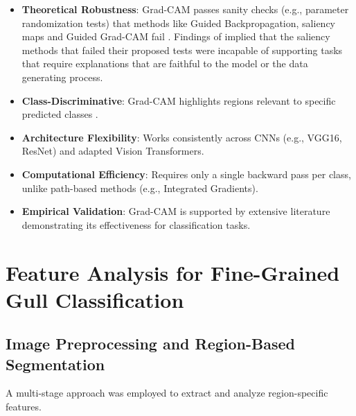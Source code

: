 \documentclass[a4paper,12pt]{report}
\begin{document}
\begin{itemize}
\item \textbf{Theoretical Robustness}: Grad-CAM passes sanity checks (e.g., parameter randomization tests) that methods like Guided Backpropagation, saliency maps and Guided Grad-CAM fail \citep{Adebayo2018}. Findings of \citep{Adebayo2018} implied that the saliency methods that failed their proposed tests were incapable of supporting tasks that require explanations that are faithful to the model or the data generating process.
\item \textbf{Class-Discriminative}: Grad-CAM highlights regions relevant to specific predicted classes \citep{Selvaraju_2019}.
\item \textbf{Architecture Flexibility}: Works consistently across CNNs (e.g., VGG16, ResNet) and adapted Vision Transformers.
\item \textbf{Computational Efficiency}: Requires only a single backward pass per class, unlike path-based methods (e.g., Integrated Gradients).
\item \textbf{Empirical Validation}: Grad-CAM is supported by extensive literature \citep{Selvaraju_2019, chefer2021generic} demonstrating its effectiveness for classification tasks.
\end{itemize}

\section{Feature Analysis for Fine-Grained Gull Classification}

\subsection{Image Preprocessing and Region-Based Segmentation}
A multi-stage approach was employed to extract and analyze region-specific features.
\end{document}
